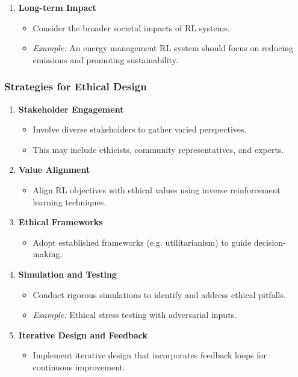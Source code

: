 \documentclass[aspectratio=169]{beamer}
\begin{document}
\begin{frame}[fragile]
\begin{enumerate}
        \item \textbf{Long-term Impact}
        \begin{itemize}
            \item Consider the broader societal impacts of RL systems.
            \item \textit{Example:} An energy management RL system should focus on reducing emissions and promoting sustainability.
        \end{itemize}
    \end{enumerate}
\end{frame}

\begin{frame}[fragile]
    \frametitle{Strategies for Ethical Design}

    \begin{enumerate}
        \item \textbf{Stakeholder Engagement}
        \begin{itemize}
            \item Involve diverse stakeholders to gather varied perspectives.
            \item This may include ethicists, community representatives, and experts.
        \end{itemize}

        \item \textbf{Value Alignment}
        \begin{itemize}
            \item Align RL objectives with ethical values using inverse reinforcement learning techniques.
        \end{itemize}

        \item \textbf{Ethical Frameworks}
        \begin{itemize}
            \item Adopt established frameworks (e.g. utilitarianism) to guide decision-making.
        \end{itemize}

        \item \textbf{Simulation and Testing}
        \begin{itemize}
            \item Conduct rigorous simulations to identify and address ethical pitfalls.
            \item \textit{Example:} Ethical stress testing with adversarial inputs.
        \end{itemize}

        \item \textbf{Iterative Design and Feedback}
        \begin{itemize}
            \item Implement iterative design that incorporates feedback loops for continuous improvement.
        \end{itemize}
    \end{enumerate}
\end{frame}
\end{document}
